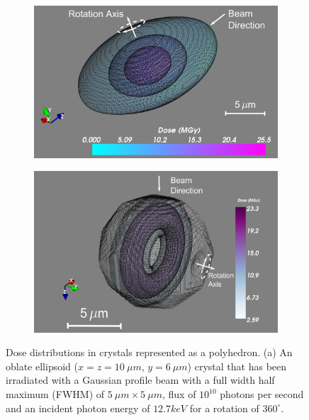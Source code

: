         \begin{figure}
            \centering
            \begin{subfigure}[b]{0.463\textwidth}
                    \centering
                    \includegraphics[width=\textwidth]{figures/introduction/ellipsoidcrystal.pdf}
                    \caption{}
                    \label{fig:Ellipsoidal crystal}
            \end{subfigure}
            \quad
            \begin{subfigure}[b]{0.437\textwidth}
                    \centering
                    \includegraphics[width=\textwidth]{figures/introduction/IcoCrystalEdges.pdf}
                    \caption{}
                    \label{fig:Icosohedral crystal}
            \end{subfigure}
            \caption{Dose distributions in crystals represented as a polyhedron. (a) An oblate ellipsoid ($x = z = 10\ \mu m$, $y = 6\ \mu m$) crystal that has been irradiated with a Gaussian profile beam with a full width half maximum (FWHM) of $5\ \mu m \times 5\ \mu m$, flux of $10^{10}$ photons per second and an incident photon energy of $12.7 keV$ for a rotation of $360^{\circ}$.
}
\end{figure}
